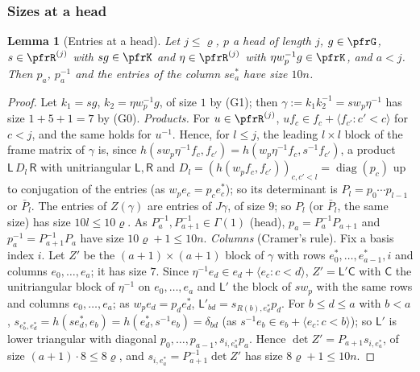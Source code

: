 \documentclass[10pt]{amsart}
\newtheorem{lemma}[theorem]{Lemma}
\theoremstyle{definition}
\theoremstyle{remark}
\begin{document}
\subsubsection*{Sizes at a head}
\begin{lemma}[Entries at a head]\label{pfr:headentries}
Let $j\le\varrho$, $p$ a head of length $j$, $g\in\pfrG$, $s\in\pfrR^{(j)}$ with $sg\in\pfrK$ and $\eta\in\pfrR^{(j)}$ with
$\eta w_p^{-1}g\in\pfrK$, and $a<j$. Then $p_a$, $p_a^{-1}$ and the entries of the column $se_a^*$ have size $10n$.
\end{lemma}
\begin{proof}
Let $k_1=sg$, $k_2=\eta w_p^{-1}g$, of size $1$ by (G1); then $\gamma:=k_1k_2^{-1}=sw_p\eta^{-1}$ has size $1+5+1=7$ by
(G0). \emph{Products.} For $u\in\pfrR^{(j)}$, $uf_c\in f_c+\langle f_{c'}:c'<c\rangle$ for $c<j$, and the same holds for
$u^{-1}$. Hence, for $l\le j$, the leading $l\times l$ block of the frame matrix of $\gamma$ is, since
$h(sw_p\eta^{-1}f_c,f_{c'})=h(w_p\eta^{-1}f_c,s^{-1}f_{c'})$, a product $\mathsf L\,D_l\,\mathsf R$ with unitriangular
$\mathsf L,\mathsf R$ and $D_l=(h(w_pf_c,f_{c'}))_{c,c'<l}=\operatorname{diag}(p_c)$ up to conjugation of the entries
(as $w_pe_c=p_ce_c^*$); so its determinant is $P_l=p_0\cdots p_{l-1}$ or $\bar P_l$. The entries of $Z(\gamma)$ are entries of $J\gamma$, of size
$9$; so $P_l$ (or $\bar P_l$, the same size) has size $10l\le10\varrho$. As $P_a^{-1},P_{a+1}^{-1}\in\Gamma(1)$ (head),
$p_a=P_a^{-1}P_{a+1}$ and $p_a^{-1}=P_{a+1}^{-1}P_a$ have size $10\varrho+1\le10n$.
\emph{Columns} (Cramer's rule). Fix a basis index $i$. Let $Z'$ be the $(a+1)\times(a+1)$ block of $\gamma$ with rows
$e_0^*,\dots,e_{a-1}^*,i$ and columns $e_0,\dots,e_a$; it has size $7$. Since $\eta^{-1}e_d\in e_d+\langle e_c:c<d\rangle$,
$Z'=\mathsf L'\mathsf C$ with $\mathsf C$ the unitriangular block of $\eta^{-1}$ on $e_0,\dots,e_a$ and $\mathsf L'$ the block
of $sw_p$ with the same rows and columns $e_0,\dots,e_a$; as $w_pe_d=p_de_d^*$, $\mathsf L'_{bd}=s_{R(b),e_d^*}p_d$. For
$b\le d\le a$ with $b<a$, $s_{e_b^*,e_d^*}=h(se_d^*,e_b)=h(e_d^*,s^{-1}e_b)=\delta_{bd}$ (as $s^{-1}e_b\in e_b+\langle e_c:c<b\rangle$); so $\mathsf
L'$ is lower triangular with diagonal $p_0,\dots,p_{a-1},s_{i,e_a^*}p_a$. Hence $\det Z'=P_{a+1}s_{i,e^*_a}$, of size
$(a+1)\cdot8\le8\varrho$, and $s_{i,e_a^*}=P_{a+1}^{-1}\det Z'$ has size $8\varrho+1\le10n$.
\end{proof}
\end{document}
